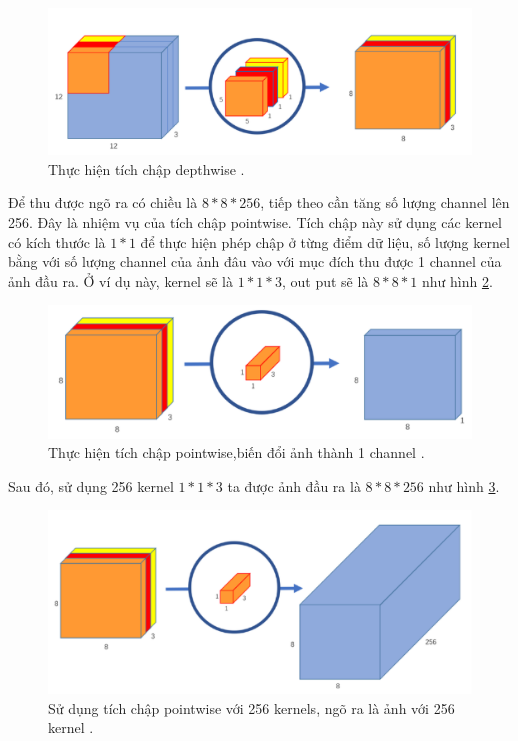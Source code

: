 \begin{figure}[ht!]
\centerline{\includegraphics[scale=0.9]{images/mobi2.png}}
\caption{Thực hiện tích chập depthwise \cite{mobile:viblo}.}
\label{fig:mobi2}
\end{figure}
Để thu được ngõ ra có chiều là $8*8*256$, tiếp theo cần tăng số lượng channel lên 256. Đây là nhiệm vụ của tích chập pointwise. Tích chập này sử dụng các kernel có kích thước là $1*1$ để thực hiện phép chập ở từng điểm dữ liệu, số lượng kernel bằng với số lượng channel của ảnh đâu vào với mục đích thu được 1 channel của ảnh đầu ra. Ở ví dụ này, kernel sẽ là $1*1*3$, out put sẽ là $8*8*1$ như hình \ref{fig:mobi3}.\par
\begin{figure}[ht!]
\centerline{\includegraphics[scale=0.9]{images/mobi3.png}}
\caption{Thực hiện tích chập pointwise,biến đổi ảnh thành 1 channel \cite{mobile:viblo}.}
\label{fig:mobi3}
\end{figure}
Sau đó, sử dụng 256 kernel $1*1*3$ ta được ảnh đầu ra là $8*8*256$ như hình \ref{fig:mobi4}.\par
\begin{figure}[ht!]
\centerline{\includegraphics[scale=0.9]{images/mobi4.png}}
\caption{Sử dụng tích chập pointwise với 256 kernels, ngõ ra là ảnh với 256 kernel \cite{mobile:viblo}.}
\label{fig:mobi4}
\end{figure}
